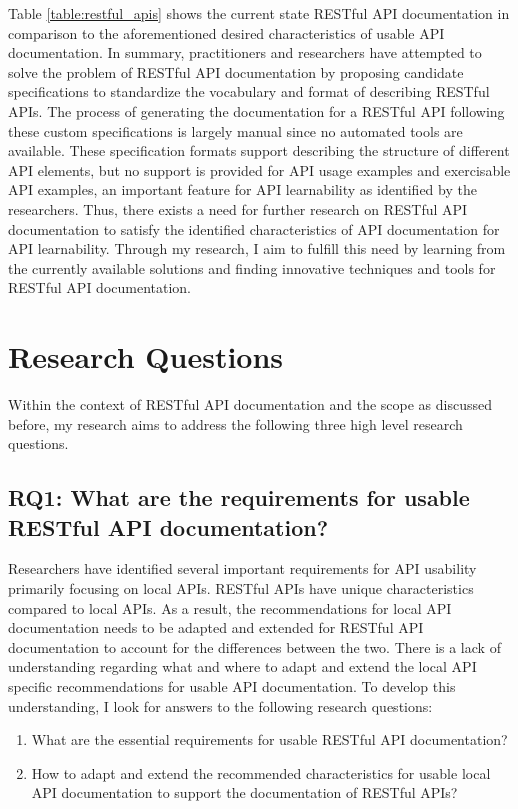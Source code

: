 \documentclass[11pt,oneside]{book}
\begin{document}
Table \ref{table:restful_apis} shows the current state RESTful API documentation in comparison to the aforementioned desired characteristics of usable API documentation. In summary, practitioners and researchers have attempted to solve the problem of RESTful API documentation by proposing candidate specifications to standardize the vocabulary and format of describing RESTful APIs. The process of generating the documentation for a RESTful API following these custom specifications is largely manual since no automated tools are available. These specification formats support describing the structure of different API elements, but no support is provided for API usage examples and exercisable API examples, an important feature for API learnability as identified by the researchers. Thus, there exists a need for further research on RESTful API documentation to satisfy the identified characteristics of API documentation for API learnability. Through my research, I aim to fulfill this need by learning from the currently available solutions and finding innovative techniques and tools for RESTful API documentation.


\section{Research Questions}

Within the context of RESTful API documentation and the scope as discussed before, my research aims to address the following three high level research questions.

\subsection{RQ1: What are the requirements for usable RESTful API documentation?
}

Researchers have identified several important requirements for API usability primarily focusing on local APIs. RESTful APIs have unique characteristics compared to local APIs. As a result, the recommendations for local API documentation needs to be adapted and extended for RESTful API documentation to account for the differences between the two. There is a lack of understanding regarding what and where to adapt and extend the local API specific recommendations for usable API documentation. To develop this understanding, I look for answers to the following research questions:

\begin{enumerate}
  \item What are the essential requirements for usable RESTful API documentation?
  \item How to adapt and extend the recommended characteristics for usable local API documentation to support the documentation of RESTful APIs?
\end{enumerate}
\end{document}
